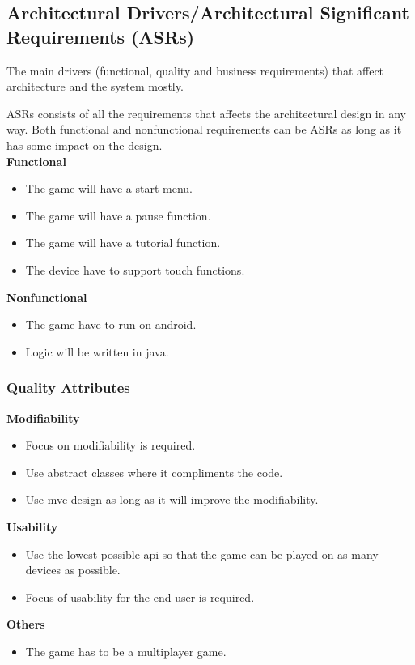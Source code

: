 \subsection{Architectural Drivers/Architectural Significant Requirements (ASRs)}
The main drivers (functional, quality and business requirements) that affect architecture and the system mostly.

ASRs consists of all the requirements that affects the architectural design in any way. Both functional and nonfunctional requirements can be ASRs as long as it has some impact on the design.\\


\textbf{Functional} 
\begin{itemize}
	\item The game will have a start menu.
	\item The game will have a pause function.
	\item The game will have a tutorial function.
	\item The device have to support touch functions.
\end{itemize}

\textbf{Nonfunctional}
\begin{itemize}
	\item The game have to run on android.
	\item Logic will be written in java.
\end{itemize}

\subsubsection{Quality Attributes}

\textbf{Modifiability}
\begin{itemize}
	\item Focus on modifiability is required.
	\item Use abstract classes where it compliments the code.
	\item Use mvc design as long as it will improve the modifiability.
\end{itemize}

\textbf{Usability}
\begin{itemize}
	\item Use the lowest possible api so that the game can be played on as many devices as possible.
	\item Focus of usability for the end-user is required.
\end{itemize}

\textbf{Others}
\begin{itemize}
	\item The game has to be a multiplayer game.
\end{itemize}
